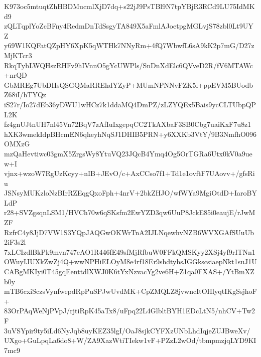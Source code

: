 K973oc5mtuqtZhHBDMucmlXjD7dq+s22jJ9PsTBl9N7tpYBjR3RCd9LU75IdMKd9
zQLTqplYoZcBFny4RedmDnTdSsgyTA849X5aFmlAJoetpgMGLvjS78zbl0Lt9UYZ
y69W1KQFatQZpHY6XpK5qWTHk7NNyRm+4fQ7WbwfL6sA9kK2p7mG/D27zMjKTcr3
RkqTybLWQHszRHFv9hIVnnO5gYcUWPls/SnDnXdElc6QVveD2R/fV6MTAWc+nrQD
GbMREg7UbDHsQSGQMaRREhdYZyP+MUmNPNNvFZK5l+ppEVM5BUodbZ68iI/hTYQz
iS27r/Io27dEb36yDWU1wHCz7k1ddaMQ4DmPZ/zLZYQEx5Bais9ycCLTUbpQPL2K
fz4gnUJtnUH7nl45Vn72BqV7zAfIuIxgepqCC2TkAXbaF3SB0Cbg7uaiKxF7u8z1
hXK3wmekIdpBHcmEN6qheyhNqSJ1DHIB5PRN+y6XXKb3VtY/9B3NmfhO096OMXzG
mzQaHevtiwc03gmX5ZrgsWy8YtuVQ23JQcB4Ymq4Og5OrTGRa6Utx0kV0a9uew+I
vjnx+wzoW7RgUzKcyy+nIB+JEvO/c+AxCCso7f1+Td1e1ovftF7UAovv+/gfsRiu
JSNsyMUKzloNzBIrRZEqgQxoFph+4nrV+2bkZHJO/wfWYa9MgiOtdD+IaroBYLdP
r28+SVZgsqnLSM1/HVCh70w6qSKsfm2EwYZD3qw6UuP8JckE85i0eaujE/rJwMZF
RzfrC4y8JjD7VW1S3YQpJAQGwOKWrTnA2IJLNqewhvNZB6WVXGAfSUuUb2iF3s2l
7xLCIzdlBkPk9mvn747eAO1R446fE49sfMjRfbuW0FFkQMSKyy2XSj4yf9rITNn1
OWuyIJUXkZwZj4Q+wwNPHiELOyM8e4rf18Er9shdtyhsJGGkscsiaepNkt1suJ1U
CABgMKIyi0T45gqEenttdlXWJ0K6tYxNzvacYg2ve6H+Z1qa0FXAS+/YtBmXZb0y
mTB6cxiSczsVynfwepdRpPuSPJwUvdMK+CpZMQLZ8jvwncItOHlyqtIKgSsjhoF+
83OrPAqWeNjPVpJ/rjtiRpK45aTx8/uFpq22L4GlbltBYH1EDcLtN5/nhCV+Tw2F
3uVSYpir9ty5iLd6NyJqb8uyKEZ35lgI/OaJ8sjkCYFXzUNbLhdIqjeZUJBweXv/
UXgo+GuLpqLa6do8+W/ZA9XazWtiTIekw1vF+PZzL2wOd/tbmpmzjqLYD9KI7mc9
